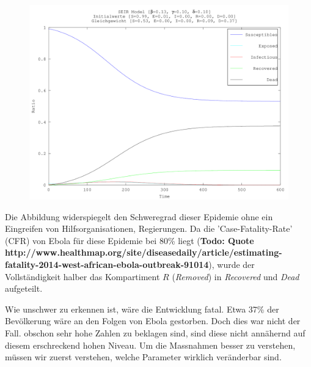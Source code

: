 \begin{refsection}
\begin{figure}[H]
	\centering
	\includegraphics[width=1\textwidth]{sir/ebola_outbreak.png}
\end{figure}
Die Abbildung widerspiegelt den Schweregrad dieser Epidemie ohne ein Eingreifen von Hilfsorganisationen, Regierungen. Da die 'Case-Fatality-Rate' (CFR) von Ebola für diese Epidemie bei 80\% liegt (\textbf{Todo: Quote http://www.healthmap.org/site/diseasedaily/article/estimating-fatality-2014-west-african-ebola-outbreak-91014}), wurde der Vollständigkeit halber das Kompartiment $R$ (\emph{Removed}) in \emph{Recovered} und \emph{Dead} aufgeteilt.

Wie unschwer zu erkennen ist, wäre die Entwicklung fatal. Etwa 37\% der Bevölkerung wäre an den Folgen von Ebola gestorben. Doch dies war nicht der Fall. obschon sehr hohe Zahlen zu beklagen sind, sind diese nicht annähernd auf diesem erschreckend hohen Niveau. Um die Massnahmen besser zu verstehen, müssen wir zuerst verstehen, welche Parameter wirklich veränderbar sind.


\end{refsection}
